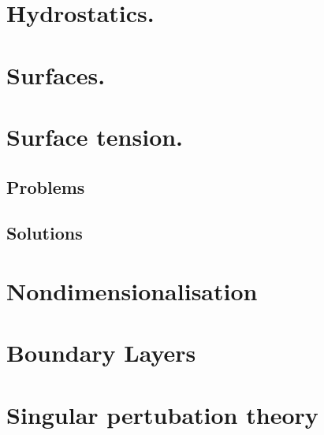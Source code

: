 
   \chapter{Hydrostatics.}

   \chapter{Surfaces.}

   \chapter{Surface tension.}
      \section{Problems}
         
      \section{Solutions}
         \shipoutAnswer

   \chapter{Nondimensionalisation}
      
      

   \chapter{Boundary Layers}
      
      
      
      

   \chapter{Singular pertubation theory}
      
      

